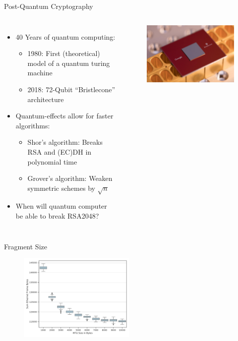 \documentclass[fleqn,compress,utf8,aspectratio=169,t]{beamer}
\begin{document}
\begin{frame}[noframenumbering]{Post-Quantum Cryptography}
  \begin{columns}[T]
      \begin{itemize}
        \item<2-> 40 Years of quantum computing:
        \begin{itemize}
          \item 1980: First (theoretical) model of a quantum turing machine
          \item 2018: 72-Qubit ``Bristlecone'' architecture
        \end{itemize}
        \item<3-> Quantum-effects allow for faster algorithms:
              \begin{itemize}
                \item Shor's algorithm: Breaks RSA and (EC)DH in polynomial time
                \item Grover's algorithm: Weaken symmetric schemes by $\sqrt{n}$
              \end{itemize}
        \item<4-> When will quantum computer be able to break RSA2048?
      \end{itemize}
      \vfill
  \begin{figure}[t]
    \includegraphics[width=1\columnwidth]{bristlecone.png}
  \end{figure}
  \end{columns}
\end{frame}

\begin{frame}[noframenumbering]{Fragment Size}
  \begin{figure}[t]
    \includegraphics[width=0.5\textwidth]{plot_box_fragment_size.pdf}
  \end{figure}
\end{frame}
\end{document}
